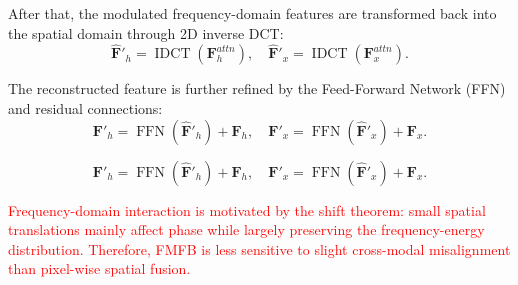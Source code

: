 After that, the modulated frequency-domain features are transformed back into the spatial domain through 2D inverse DCT:
\begin{equation}
\hat{\mathbf{F}}'_h=\operatorname{IDCT}(\mathbf{F}^{attn}_h),
\quad
\hat{\mathbf{F}}'_x=\operatorname{IDCT}(\mathbf{F}^{attn}_x).
\end{equation}

The reconstructed feature is further refined by the Feed-Forward Network (FFN) and residual connections:
\begin{equation}
\mathbf{F}'_h=\operatorname{FFN}(\hat{\mathbf{F}}'_h) + \mathbf{F}_h,
\quad
\mathbf{F}'_x=\operatorname{FFN}(\hat{\mathbf{F}}'_x) + \mathbf{F}_x.
\end{equation}

\begin{equation}
\mathbf{F}'_h=\operatorname{FFN}(\hat{\mathbf{F}}'_h) + \mathbf{F}_h,
\quad
\mathbf{F}'_x=\operatorname{FFN}(\hat{\mathbf{F}}'_x) + \mathbf{F}_x.
\end{equation}

\textcolor{red}{Frequency-domain interaction is motivated by the shift theorem: small spatial translations mainly affect phase while largely preserving the frequency-energy distribution. Therefore, FMFB is less sensitive to slight cross-modal misalignment than pixel-wise spatial fusion.} 
